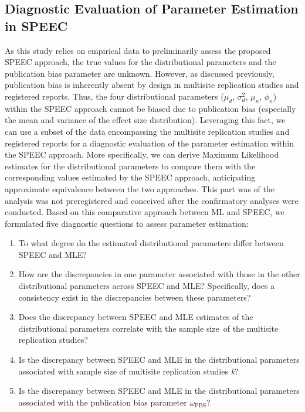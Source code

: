 \documentclass[
  12pt,
]{scrartcl}
\providecommand{\tightlist}{%
  \setlength{\itemsep}{0pt}\setlength{\parskip}{0pt}}\usepackage{longtable,booktabs,array}
\newcommand{\pbs}{\omega_{\text{PBS}}}
\begin{document}
\subsection{Diagnostic Evaluation of Parameter Estimation in
SPEEC}\label{diagnostic-evaluation-of-parameter-estimation-in-speec}

As this study relies on empirical data to preliminarily assess the
proposed SPEEC approach, the true values for the distributional
parameters and the publication bias parameter are unknown. However, as
discussed previously, publication bias is inherently absent by design in
multisite replication studies and registered reports. Thus, the four
distributional parameters (\(\mu_d\), \(\sigma^2_d\), \(\mu_n\),
\(\phi_n\)) within the SPEEC approach cannot be biased due to
publication bias (especially the mean and variance of the effect size
distribution). Leveraging this fact, we can use a subset of the data
encompassing the multisite replication studies and registered reports
for a diagnostic evaluation of the parameter estimation within the SPEEC
approach. More specifically, we can derive Maximum Likelihood estimates
for the distributional parameters to compare them with the corresponding
values estimated by the SPEEC approach, anticipating approximate
equivalence between the two approaches. This part was of the analysis
was not preregistered and conceived after the confirmatory analyses were
conducted. Based on this comparative approach between ML and SPEEC, we
formulated five diagnostic questions to assess parameter estimation:

\begin{enumerate}
\def\labelenumi{\arabic{enumi}.}
\tightlist
\item
  To what degree do the estimated distributional parameters differ
  between SPEEC and MLE?
\item
  How are the discrepancies in one parameter associated with those in
  the other distributional parameters across SPEEC and MLE?
  Specifically, does a consistency exist in the discrepancies between
  these parameters?
\item
  Does the discrepancy between SPEEC and MLE estimates of the
  distributional parameters correlate with the sample size~of the
  multisite replication studies?
\item
  Is the discrepancy between SPEEC and MLE in the distributional
  parameters associated with sample size of multisite replication
  studies \emph{k}?
\item
  Is the discrepancy between SPEEC and MLE in the distributional
  parameters associated with the publication bias parameter \(\pbs\)?
\end{enumerate}
\end{document}
